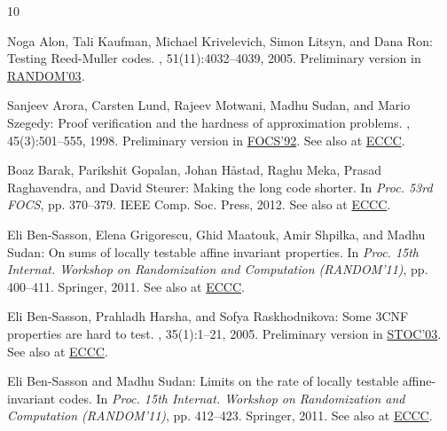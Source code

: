 \tocrefpdfbookmark
\begin{thebibliography}{10}

{\sc Noga Alon, Tali Kaufman, Michael Krivelevich, Simon Litsyn, and Dana Ron}:
  Testing {Reed-Muller} codes.
, 51(11):4032--4039, 2005.
\newblock Preliminary version in
  \href{http://dx.doi.org/10.1007/978-3-540-45198-3_17}{RANDOM'03}.

{\sc Sanjeev Arora, Carsten Lund, Rajeev Motwani, Madhu Sudan, and Mario
  Szegedy}: Proof verification and the hardness of approximation problems.
, 45(3):501--555, 1998.
\newblock Preliminary version in
  \href{http://dx.doi.org/10.1109/SFCS.1992.267823}{FOCS'92}. See also at
  \href{http://eccc.hpi-web.de/report/1998/008/}{ECCC}.
\newblock [\epfmtdoi{10.1145/278298.278306}]

{\sc Boaz Barak, Parikshit Gopalan, Johan H{\aa}stad, Raghu Meka, Prasad
  Raghavendra, and David Steurer}: Making the long code shorter.
\newblock In {\em Proc. 53rd FOCS}, pp. 370--379. IEEE Comp. Soc. Press, 2012.
\newblock See also at \href{http://eccc.hpi-web.de/report/2011/142/}{ECCC}.

{\sc Eli {Ben-Sasson}, Elena Grigorescu, Ghid Maatouk, Amir Shpilka, and Madhu
  Sudan}: On sums of locally testable affine invariant properties.
\newblock In {\em Proc. 15th Internat. Workshop on Randomization and
  Computation (RANDOM'11)}, pp. 400--411. Springer, 2011.
\newblock See also at \href{http://eccc.hpi-web.de/report/2011/079/}{ECCC}.
\newblock [\epfmtdoi{10.1007/978-3-642-22935-0\_34}]

{\sc Eli {Ben-Sasson}, Prahladh Harsha, and Sofya Raskhodnikova}: Some 3{CNF}
  properties are hard to test.
, 35(1):1--21, 2005.
\newblock Preliminary version in
  \href{http://dx.doi.org/10.1145/780542.780594}{STOC'03}. See also at
  \href{http://eccc.hpi-web.de/report/2003/006/}{ECCC}.
\newblock [\epfmtdoi{10.1137/S0097539704445445}]

{\sc Eli {Ben-Sasson} and Madhu Sudan}: Limits on the rate of locally testable
  affine-invariant codes.
\newblock In {\em Proc. 15th Internat. Workshop on Randomization and
  Computation (RANDOM'11)}, pp. 412--423. Springer, 2011.
\newblock See also at \href{http://eccc.hpi-web.de/report/2010/108/}{ECCC}.
\newblock [\epfmtdoi{10.1007/978-3-642-22935-0\_35}]


\end{thebibliography}

